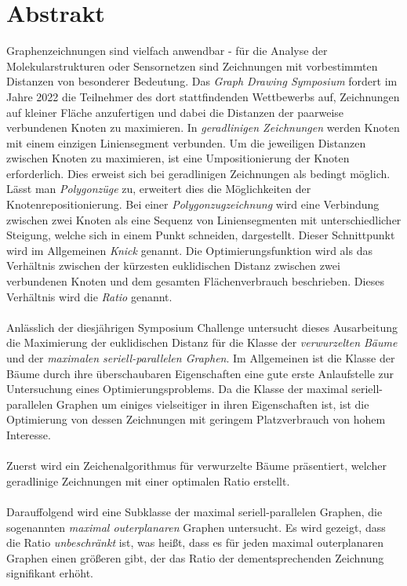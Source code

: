 \section*{Abstrakt}
Graphenzeichnungen sind vielfach anwendbar - für die Analyse der Molekularstrukturen oder Sensornetzen sind Zeichnungen mit vorbestimmten Distanzen von besonderer Bedeutung. Das \emph{Graph Drawing Symposium} fordert im Jahre 2022 die Teilnehmer des dort stattfindenden Wettbewerbs auf, Zeichnungen auf kleiner Fläche anzufertigen und dabei die Distanzen der paarweise verbundenen Knoten zu maximieren. In \emph{geradlinigen Zeichnungen} werden Knoten mit einem einzigen Liniensegment verbunden. Um die jeweiligen Distanzen zwischen Knoten zu maximieren, ist eine Umpositionierung der Knoten erforderlich. Dies erweist sich bei geradlinigen Zeichnungen als bedingt möglich. Lässt man \emph{Polygonzüge} zu, erweitert dies die Möglichkeiten der Knotenrepositionierung. Bei einer \emph{Polygonzugzeichnung} wird eine Verbindung zwischen zwei Knoten als eine Sequenz von Liniensegmenten mit unterschiedlicher Steigung, welche sich in einem Punkt schneiden, dargestellt. Dieser Schnittpunkt wird im Allgemeinen \emph{Knick} genannt. Die Optimierungsfunktion wird als das Verhältnis zwischen der kürzesten euklidischen Distanz zwischen zwei verbundenen Knoten und dem gesamten Flächenverbrauch beschrieben. Dieses Verhältnis wird die \emph{Ratio} genannt.
\\\\
Anlässlich der diesjährigen Symposium Challenge untersucht dieses Ausarbeitung die Maximierung der euklidischen Distanz für die Klasse der \emph{verwurzelten Bäume} und der \emph{maximalen seriell-parallelen Graphen}. Im Allgemeinen ist die Klasse der Bäume durch ihre überschaubaren Eigenschaften eine gute erste Anlaufstelle zur Untersuchung eines Optimierungsproblems. Da die Klasse der maximal seriell-parallelen Graphen um einiges vielseitiger in ihren Eigenschaften ist, ist die Optimierung von dessen Zeichnungen mit geringem Platzverbrauch von hohem Interesse.
\\\\
Zuerst wird ein Zeichenalgorithmus für verwurzelte Bäume präsentiert, welcher geradlinige Zeichnungen mit einer optimalen Ratio erstellt.\\\\
Darauffolgend wird eine Subklasse der maximal seriell-parallelen Graphen, die sogenannten \emph{maximal outerplanaren} Graphen untersucht. Es wird gezeigt, dass die Ratio \emph{unbeschränkt} ist, was heißt, dass es für jeden maximal outerplanaren Graphen einen größeren gibt, der das Ratio der dementsprechenden Zeichnung signifikant erhöht.\\
